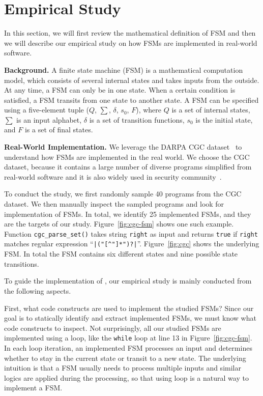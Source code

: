 \section{Empirical Study}
\label{sec:study}
In this section, we will first review the mathematical definition of FSM and then
we will describe our empirical study on how FSMs are implemented 
in real-world software. 

\noindent\textbf{Background.}
A finite state machine (FSM) is a mathematical computation model, 
which consists of several internal states and takes inputs from the outside.
At any time, a FSM can only be in one state. 
When a certain condition is satisfied, 
a FSM transits from one state to another state. 
A FSM can be specified using a five-element tuple ($Q$, $\sum$, $\delta$, $s_0$, $F$),
where $Q$ is a set of internal states, $\sum$ is an input alphabet, 
$\delta$ is a set of transition functions,
$s_0$ is the initial state, and $F$ is a set of final states. 

\noindent\textbf{Real-World Implementation.}
We leverage the DARPA CGC dataset~\cite{CGC} to 
understand how FSMs are implemented in the real world. 
We choose the CGC dataset, because it 
contains a large number of diverse programs simplified 
from real-world software and it 
is also widely used in security 
community~\cite{QSYM, Driller, VUzzer}. 


To conduct the study, we first randomly sample 
40 programs from the CGC dataset.
We then manually inspect the sampled programs and look for implementation of FSMs.
In total, we identify 25 implemented FSMs, 
and they are the targets of our study.
Figure~\ref{fig:cgc-fsm} shows one such example.
Function \texttt{cgc\_parse\_set()} takes string \texttt{right} 
as input and returns \texttt{true} if \texttt{right} matches 
regular expression ``\verb/|("[^"]*")?|/''. 
Figure~\ref{fig:cgc} shows the underlying FSM. 
In total the FSM contains six different states 
and nine possible state transitions. 





To guide the implementation of \Tool{}, our empirical study 
is mainly conducted from the following aspects.


First, what code constructs are used to implement the studied FSMs?
Since our goal is to statically identify and extract implemented FSMs, 
we must know what code constructs to inspect. 
Not surprisingly, all our studied FSMs are implemented using a loop, 
like the \texttt{while} loop at line 13 in Figure~\ref{fig:cgc-fsm}.  
In each loop iteration, an implemented FSM processes an input and 
determines whether to stay in the current state or transit to a new state. 
The underlying intuition is that a FSM usually needs to process 
multiple inputs and similar logics are applied during the processing, 
so that using loop is a natural way to implement a FSM. 

